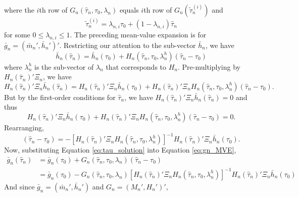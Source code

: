 \documentclass[12pt]{article}
\begin{document}
where the $i$th row of $G_n(\widehat{\tau}_n, \tau_0, \lambda_n)$ equals $i$th row of $G_n(\widetilde{\tau}_n^{(i)})$ and 
\[
\widetilde{\tau}_n^{(i)} = \lambda_{n,i}\tau_0 + (1 - \lambda_{n,i}) \widehat{\tau}_n
\] 
for some $0 \leq \lambda_{n,i} \leq 1$.
The preceding mean-value expansion is for $\bar{g}_n = (\bar{m}_n', \bar{h}_n')'$.
Restricting our attention to the sub-vector $\bar{h}_n$, we have
\[
  \bar{h}_n(\widehat{\tau}_n) = \bar{h}_n(\tau_0) + H_n(\widehat{\tau}_n, \tau_0, \lambda^h_n)(\widehat{\tau}_n - \tau_0) 
\]
where $\lambda^h_n$ is the sub-vector of $\lambda_n$ that corresponds to $H_n$. 
Pre-multiplying by $H_n(\widehat{\tau}_n)'\Xi_n$, we have
\[
  H_n(\widehat{\tau}_n)'\Xi_n\bar{h}_n(\widehat{\tau}_n) = H_n(\widehat{\tau}_n)'\Xi_n \bar{h}_n(\tau_0) + H_n(\widehat{\tau}_n)'\Xi_n H_n(\widehat{\tau}_n, \tau_0, \lambda^h_n)(\widehat{\tau}_n - \tau_0).
\]
But by the first-order conditions for $\widehat{\tau}_n$, we have  $H_n(\widehat{\tau}_n)'\Xi_n \bar{h}_n(\widehat{\tau}_n) = 0$ and thus
\[
  H_n(\widehat{\tau}_n)'\Xi_n \bar{h}_n(\tau_0) + H_n(\widehat{\tau}_n)'\Xi_n H_n(\widehat{\tau}_n, \tau_0, \lambda^h_n)(\widehat{\tau}_n - \tau_0) = 0.
\]
Rearranging,
\begin{equation}
  (\widehat{\tau}_n - \tau_0) = -\left[ H_n(\widehat{\tau}_n)'\Xi_n H_n(\widehat{\tau}_n, \tau_0, \lambda^h_n)\right]^{-1} H_n(\widehat{\tau}_n)'\Xi_n \bar{h}_n(\tau_0).
  \label{eq:tau_solution}
\end{equation}
Now, substituting Equation \ref{eq:tau_solution} into Equation \ref{eq:gn_MVE},
\begin{align*}
  \bar{g}_n\left(\widehat{\tau}_n\right) &= \bar{g}_n(\tau_0) + G_n(\widehat{\tau}_n, \tau_0, \lambda_n) \left( \widehat{\tau}_n - \tau_0 \right)\\
  &= \bar{g}_n(\tau_0) - G_n(\widehat{\tau}_n, \tau_0, \lambda_n) \left[ H_n(\widehat{\tau}_n)'\Xi_n H_n(\widehat{\tau}_n, \tau_0, \lambda^h_n)\right]^{-1} H_n(\widehat{\tau}_n)'\Xi_n \bar{h}_n(\tau_0)
\end{align*}
And since $\bar{g}_n = (\bar{m}_n', \bar{h}_n')$ and $G_n = (M_n', H_n')'$, 
\end{document}
